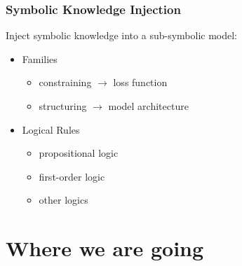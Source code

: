 \documentclass[presentation]{beamer}\mode<presentation>{\usetheme{blackAMSBolognaFC}}
\begin{document}
\begin{frame}%
\frametitle{Symbolic Knowledge Injection}

    \alert{Inject} symbolic knowledge into a sub-symbolic model:~
    \vspace{0.5cm}
    \begin{itemize}
        \item Families
        \begin{itemize}
            \item constraining $\rightarrow$ \alert{loss function}
            \item structuring $\rightarrow$ \alert{model architecture}
        \end{itemize}

        \vfill

        \item Logical Rules
        \begin{itemize}
            \item propositional logic
            \item first-order logic
            \item other logics
        \end{itemize}

        \vfill
    \end{itemize}

\end{frame}

\section{Where we are going}
\end{document}
